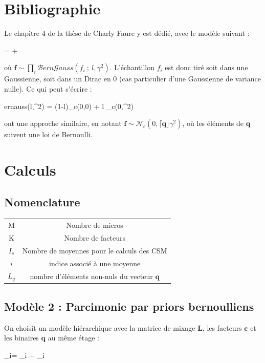 \documentclass[ 12pt]{article}
\renewenvironment{equation}{\vspace{-0.2cm}\begin{oldequation}}{\vspace{-0.2cm}\end{oldequation}}
\newcommand{\diag}[1]{\lceil#1\rfloor}
\begin{document}
\section{Bibliographie}
Le chapitre 4 de la thèse de Charly Faure y est dédié, avec le modèle suivant : 
\begin{equation}
        = + 
\end{equation}
où $\bm{f} \sim \prod_i \mathcal{B}ern\mathcal{G}auss(f_i~;~ l,\gamma^2)$. L'échantillon $f_i$ est donc tiré soit dans une Gaussienne, soit dans un Dirac en 0 (cas particulier d'une Gaussienne de variance nulle). Ce qui peut s'écrire : 
\begin{equation}
        ernauss(l,\gamma^2) = (1-l)_c(0,0) + l _c(0,\gamma^2)
\end{equation}

\cite{Ge2011} ont une approche similaire, en notant $\bm{f} \sim \mathcal{N}_c(0,\diag{\bm{q}}\gamma^2)$, où les éléments de $\bm{q}$ suivent une loi de Bernoulli.


\section{Calculs}
\subsection{Nomenclature}
\begin{tabular}{c c}
M & Nombre de micros\\
K & Nombre de facteurs\\
$I_{s}$ & Nombre de moyennes pour le calculs des CSM\\
$i$ & indice associé à une moyenne\\
$L_q$ & nombre d'éléments non-nuls du vecteur $\bm{q}$

\end{tabular}

\subsection{Modèle 2 : Parcimonie par priors bernoulliens}
On choisit un modèle hiérarchique avec la matrice de mixage $\bm{L}$, les facteurs $\bm{c}$ et les binaires $\bm{q}$ au même étage :
\begin{equation}
        _i= \bm{L  \diag{q} c }_i + _i
\end{equation}
\end{document}
